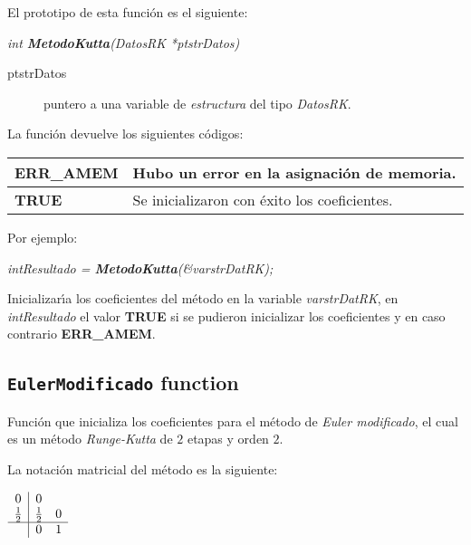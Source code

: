 El prototipo de esta funci\'on es el siguiente:

\begin{center}
\emph{int \textbf{MetodoKutta}(DatosRK *ptstrDatos)}
\end{center}

\begin{description}
\item[ptstrDatos] puntero a una variable de \emph{estructura} del tipo
\emph{DatosRK}.
\end{description}

La funci\'on devuelve los siguientes c\'odigos:

\begin{center}
\begin{tabular}{|l|l|}
\hline
\textbf{ERR\_AMEM} & Hubo un error en la asignaci\'on de memoria. \\
\hline
\textbf{TRUE} & Se inicializaron con \'exito los coeficientes. \\
\hline
\end{tabular}
\end{center}

Por ejemplo:

\begin{center}
\emph{intResultado = \textbf{MetodoKutta}(\&varstrDatRK);}
\end{center}

Inicializar\'{\i}a los coeficientes del m\'etodo en la variable
\emph{varstrDatRK}, en \emph{intResultado} el valor \textbf{TRUE} si se pudieron
inicializar los coeficientes y en caso contrario \textbf{ERR\_AMEM}.

\subsection{\texttt{EulerModificado} function}

Funci\'on que inicializa los coeficientes para el m\'etodo de \emph{Euler 
modificado}, el cual es un m\'etodo \emph{Runge-Kutta} de $2$ etapas y 
orden $2$.\newline

La notaci\'on matricial del m\'etodo es la siguiente:

\begin{center}
$
\begin{array}{c|cc}
0 & 0 \\
\frac{1}{2} & \frac{1}{2} & 0 \\
\hline
 & 0 & 1
\end{array}
$
\end{center}

